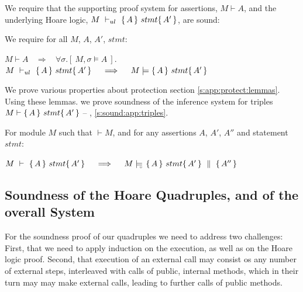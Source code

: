 We require  that the supporting proof system for assertions, $M\vdash A$, and the  underlying Hoare logic, $M\ \vdash_{ul}\  \triple A {stmt} {A'}$, are sound:
\begin{axiom}
\label{lemma:axiom:enc:assert:ul}
\label{ax:ul:sound}
We require for all $M$, $A$, $A'$, $stmt$:
\begin{center}
$M \vdash A   \ \ \ \  \Longrightarrow  \ \ \ \  \forall \sigma.[\ M, \sigma \models A\ ]$.\\
%
%
{$M\ \vdash_{ul}\   \{\, A \, \}\ stmt \{\, A' \, \}  \ \ \ \  \Longrightarrow  \ \ \ \ M \models   \{\, A \, \}\ stmt \{\, A' \, \}$ }
 \end{center}
\end{axiom}

\noindent
\label{sect:prove:triples:sound}
We prove various properties about protection
\cf section \ref{s:app:protect:lemmas}.
Using these lemmas. we prove soundness of the inference system for triples $M \vdash   \{\, A \, \}\ stmt \{\, A' \, \} $ -- \cf \A, \ref{s:sound:app:triples}.

 
 


\begin{Theorem}
\label{l:triples:sound}
For module  $M$ %
such that  $\vdash M$, and for any assertions $A$,  $A'$, $A''$ and statement  $stmt$:
\begin{center}
$M\ \vdash\  \triple A {stmt} {A'}  \ \ \ \  \Longrightarrow  \ \ \ \ \satisfiesD {M} {\quadruple {A} {stmt} {A'} {A''}}$
\end{center}
\end{Theorem}
 



\subsection{Soundness of the Hoare Quadruples, and of the overall System}

For the soundness proof of our quadruples we need to address two challenges:
First, that we need to apply induction on the execution, as well as on the Hoare logic proof. 
Second, that execution of an external call may consist os any number of external steps, interleaved with calls of public, internal methods, which in their turn may may make external calls, leading to further calls of public methods.


